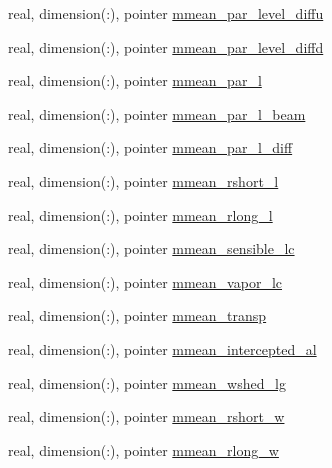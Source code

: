 \begin{DoxyCompactItemize}
\item 
real, dimension(\+:), pointer \hyperlink{structed__state__vars_1_1patchtype_a4af484f6e1a92f93686df85dc03503e9}{mmean\+\_\+par\+\_\+level\+\_\+diffu}
\item 
real, dimension(\+:), pointer \hyperlink{structed__state__vars_1_1patchtype_aa864d0c1fdd881239105d381238d990a}{mmean\+\_\+par\+\_\+level\+\_\+diffd}
\item 
real, dimension(\+:), pointer \hyperlink{structed__state__vars_1_1patchtype_afb15e5d762f34e6a195a66b51ed28ec4}{mmean\+\_\+par\+\_\+l}
\item 
real, dimension(\+:), pointer \hyperlink{structed__state__vars_1_1patchtype_a3cac9b4eb3160763860f141ae8b8efa3}{mmean\+\_\+par\+\_\+l\+\_\+beam}
\item 
real, dimension(\+:), pointer \hyperlink{structed__state__vars_1_1patchtype_a76571c3517d42bc9fd3e19eca9f33801}{mmean\+\_\+par\+\_\+l\+\_\+diff}
\item 
real, dimension(\+:), pointer \hyperlink{structed__state__vars_1_1patchtype_a18ef4cc9a9ef539e77b0edb89984d426}{mmean\+\_\+rshort\+\_\+l}
\item 
real, dimension(\+:), pointer \hyperlink{structed__state__vars_1_1patchtype_a45dbfef7d066030242d7a22e75162dae}{mmean\+\_\+rlong\+\_\+l}
\item 
real, dimension(\+:), pointer \hyperlink{structed__state__vars_1_1patchtype_a1621cc68c3e35057d5adea1e3df86589}{mmean\+\_\+sensible\+\_\+lc}
\item 
real, dimension(\+:), pointer \hyperlink{structed__state__vars_1_1patchtype_af6d26eac989579bb6811ec44df773a9a}{mmean\+\_\+vapor\+\_\+lc}
\item 
real, dimension(\+:), pointer \hyperlink{structed__state__vars_1_1patchtype_a807874e9a552ab551248bbbc9ccbc67d}{mmean\+\_\+transp}
\item 
real, dimension(\+:), pointer \hyperlink{structed__state__vars_1_1patchtype_af98f1a5cfd299230c2ea46e70642075b}{mmean\+\_\+intercepted\+\_\+al}
\item 
real, dimension(\+:), pointer \hyperlink{structed__state__vars_1_1patchtype_a56ea1780825a5fd8c97b2e55f7fc692a}{mmean\+\_\+wshed\+\_\+lg}
\item 
real, dimension(\+:), pointer \hyperlink{structed__state__vars_1_1patchtype_a6e2eccd5b3e4a3107582d7b53115d0a6}{mmean\+\_\+rshort\+\_\+w}
\item 
real, dimension(\+:), pointer \hyperlink{structed__state__vars_1_1patchtype_adaae6dc0b2da79c469f3fc763bcd044f}{mmean\+\_\+rlong\+\_\+w}

\end{DoxyCompactItemize}
